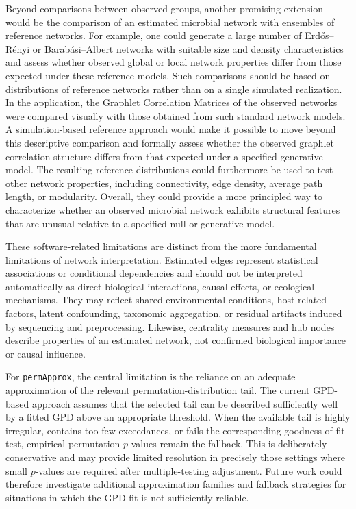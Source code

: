 Beyond comparisons between observed groups, another promising extension would be the comparison of an estimated microbial network with ensembles of reference networks. For example, one could generate a large number of Erd\H{o}s--R\'enyi or Barab\'asi--Albert networks with suitable size and density characteristics and assess whether observed global or local network properties differ from those expected under these reference models. Such comparisons should be based on distributions of reference networks rather than on a single simulated realization. In the application, the Graphlet Correlation Matrices of the observed networks were compared visually with those obtained from such standard network models. A simulation-based reference approach would make it possible to move beyond this descriptive comparison and formally assess whether the observed graphlet correlation structure differs from that expected under a specified generative model. The resulting reference distributions could furthermore be used to test other network properties, including connectivity, edge density, average path length, or modularity. Overall, they could provide a more principled way to characterize whether an observed microbial network exhibits structural features that are unusual relative to a specified null or generative model.

These software-related limitations are distinct from the more fundamental limitations of network interpretation. Estimated edges represent statistical associations or conditional dependencies and should not be interpreted automatically as direct biological interactions, causal effects, or ecological mechanisms. They may reflect shared environmental conditions, host-related factors, latent confounding, taxonomic aggregation, or residual artifacts induced by sequencing and preprocessing. Likewise, centrality measures and hub nodes describe properties of an estimated network, not confirmed biological importance or causal influence.

\newpage
For \texttt{permApprox}, the central limitation is the reliance on an adequate approximation of the relevant permutation-distribution tail. The current GPD-based approach assumes that the selected tail can be described sufficiently well by a fitted GPD above an appropriate threshold. When the available tail is highly irregular, contains too few exceedances, or fails the corresponding goodness-of-fit test, empirical permutation $p$-values remain the fallback. This is deliberately conservative and may provide limited resolution in precisely those settings where small $p$-values are required after multiple-testing adjustment. Future work could therefore investigate additional approximation families and fallback strategies for situations in which the GPD fit is not sufficiently reliable.

